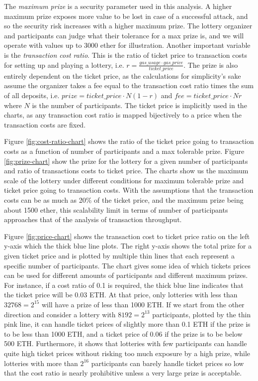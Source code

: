 The \emph{maximum prize} is a security parameter used in this analysis. A higher maximum prize exposes more value to be lost in case of a successful attack, and so the security risk increases with a higher maximum prize. The lottery organizer and participants can judge what their tolerance for a max prize is, and we will operate with values up to 3000 ether for illustration. Another important variable is the \emph{transaction cost ratio}. This is the ratio of ticket price to transaction costs for setting up and playing a lottery, i.e. $r=\frac{gas\_usage \cdot gas\_price}{ticket\_price}$. The prize is also entirely dependent on the ticket price, as the calculations for simplicity's sake assume the organizer takes a fee equal to the transaction cost ratio times the sum of all deposits, i.e. $prize=ticket\_price \cdot N(1-r)$ and $fee=ticket\_price \cdot Nr$ where $N$ is the number of participants. The ticket price is implicitly used in the charts, as any transaction cost ratio is mapped bijectively to a price when the transaction costs are fixed.

Figure \ref{fig:cost-ratio-chart} shows the ratio of the ticket price going to transaction costs as a function of number of participants and a max tolerable prize. Figure \ref{fig:prize-chart} show the prize for the lottery for a given number of participants and ratio of transactions costs to ticket price.
The charts show us the maximum scale of the lottery under different conditions for maximum tolerable prize and ticket price going to transaction costs. With the assumptions that the transaction costs can be as much as 20\% of the ticket price, and the maximum prize being about 1500 ether, this scalability limit in terms of number of participants approaches that of the analysis of transaction throughput.

Figure \ref{fig:price-chart} shows the transaction cost to ticket price ratio on the left y-axis which the thick blue line plots. The right y-axis shows the total prize for a given ticket price and is plotted by multiple thin lines that each represent a specific number of participants. The chart gives some idea of which tickets prices can be used for different amounts of participants and different maximum prizes. For instance, if a cost ratio of 0.1 is required, the thick blue line indicates that the ticket price will be 0.03 ETH. At that price, only lotteries with less than $32768=2^{15}$ will have a prize of less than 1000 ETH. If we start from the other direction and consider a lottery with $8192=2^{13}$ participants, plotted by the thin pink line, it can handle ticket prices of slightly more than 0.1 ETH if the prize is to be less than 1000 ETH, and a ticket price of 0.06 if the prize is to be below 500 ETH. Furthermore, it shows that lotteries with few participants can handle quite high ticket prices without risking too much exposure by a high prize, while lotteries with more than $2^{16}$ participants can barely handle ticket prices so low that the cost ratio is nearly prohibitive unless a very large prize is acceptable.


